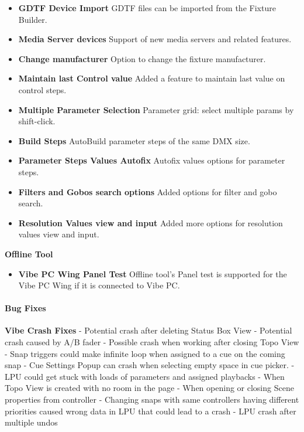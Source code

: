 \documentclass[
]{article}
\providecommand{\tightlist}{%
  \setlength{\itemsep}{0pt}\setlength{\parskip}{0pt}}
\begin{document}
\begin{itemize}
\item
  \textbf{GDTF Device Import} GDTF files can be imported from the Fixture Builder.
\item
  \textbf{Media Server devices} Support of new media servers and related features.
\item
  \textbf{Change manufacturer} Option to change the fixture manufacturer.
\item
  \textbf{Maintain last Control value} Added a feature to maintain last value on control steps.
\item
  \textbf{Multiple Parameter Selection} Parameter grid: select multiple params by shift-click.
\item
  \textbf{Build Steps} AutoBuild parameter steps of the same DMX size.
\item
  \textbf{Parameter Steps Values Autofix} Autofix values options for parameter steps.
\item
  \textbf{Filters and Gobos search options} Added options for filter and gobo search.
\item
  \textbf{Resolution Values view and input} Added more options for resolution values view and input.
\end{itemize}

\textbf{Offline Tool}

\begin{itemize}
\tightlist
\item
  \textbf{Vibe PC Wing Panel Test} Offline tool's Panel test is supported for the Vibe PC Wing if it is connected to Vibe PC.
\end{itemize}

\hypertarget{bug-fixes-1}{%
\paragraph{Bug Fixes}\label{bug-fixes-1}}

\textbf{Vibe Crash Fixes}
- Potential crash after deleting Status Box View
- Potential crash caused by A/B fader
- Possible crash when working after closing Topo View
- Snap triggers could make infinite loop when assigned to a cue on the coming snap
- Cue Settings Popup can crash when selecting empty space in cue picker.
- LPU could get stuck with loads of parameters and assigned playbacks
- When Topo View is created with no room in the page
- When opening or closing Scene properties from controller
- Changing snaps with same controllers having different priorities caused wrong data in LPU that could lead to a crash
- LPU crash after multiple undos
\end{document}
